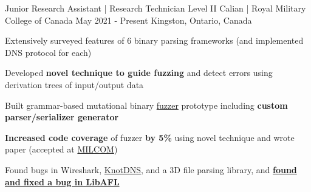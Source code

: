 \begin{cventries}
  \cventry
    {Junior Research Assistant | Research Technician Level II} %
    {Calian | Royal Military College of Canada} %
    {May 2021 - Present} %
    {Kingston, Ontario, Canada} %
    {
      \begin{cvitems} %
        \item{Extensively surveyed features of 6 binary parsing frameworks (and implemented DNS protocol for each)}
        \item{Developed \textbf{novel technique to guide fuzzing} and detect errors using derivation trees of input/output data}
        \item{Built grammar-based mutational binary \href{https://en.wikipedia.org/wiki/Fuzzing}{fuzzer} prototype including \textbf{custom parser/serializer generator}} %
        \item{\textbf{Increased code coverage} of fuzzer \textbf{by 5\%} using novel technique and wrote paper (accepted at \href{https://milcom2023.milcom.org}{MILCOM})} %
        \item{Found bugs in Wireshark, \href{https://github.com/CZ-NIC/knot}{KnotDNS}, and a 3D file parsing library, and \textbf{\href{https://github.com/AFLplusplus/LibAFL/pull/1317}{found and fixed a bug in LibAFL}}}
      \end{cvitems}
    }


\end{cventries}
